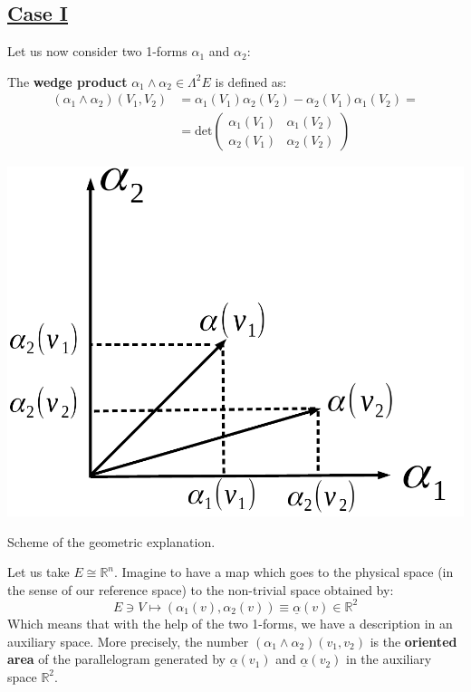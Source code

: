 \documentclass[../main.tex]{subfiles}
\begin{document}
\subsection{\underline{Case I}}Let us now consider two 1-forms $\alpha_1$ and $\alpha_2$:
\begin{definition}
The \textbf{wedge product} $\alpha_1\wedge\alpha_2\in\Lambda^2 E$ is defined as:
\begin{align*}
(\alpha_1\wedge\alpha_2)(V_1,V_2)
&=\alpha_1(V_1)\alpha_2(V_2)-\alpha_2(V_1)\alpha_1(V_2)=\\
&=\textrm{det}\begin{pmatrix}
\alpha_1(V_1) & \alpha_1(V_2)\\
\alpha_2(V_1) & \alpha_2(V_2) 
\end{pmatrix}
\end{align*}
\end{definition}
\begin{marginfigure}[8mm]
	\includegraphics[width=1.1\linewidth]{images/geom_explanation.pdf}
	\caption{Scheme of the geometric explanation.}
\end{marginfigure}
\begin{kaobox}[frametitle=Remark: Geometric meaning]
Let us take $E\cong\mathbb{R}^n$. Imagine to have a map which goes to the physical space (in the sense of our reference space) to the non-trivial space obtained by:
\[
E\ni V \mapsto (\alpha_1(v),\alpha_2(v))\equiv\underline{\alpha}(v)\in\mathbb{R}^2
\]
Which means that with the help of the two 1-forms, we have a description in an auxiliary space. More precisely, the number $(\alpha_1\wedge\alpha_2)(v_1,v_2)$ is the \textbf{oriented area} of the parallelogram generated by $\underline{\alpha}(v_1)$ and $\underline{\alpha}(v_2)$ in the auxiliary space $\mathbb{R}^2$.
\end{kaobox}
\end{document}
